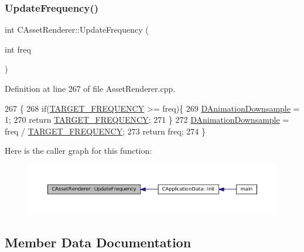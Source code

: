\subsubsection{\texorpdfstring{Update\+Frequency()}{UpdateFrequency()}}
{\footnotesize\ttfamily int C\+Asset\+Renderer\+::\+Update\+Frequency (\begin{DoxyParamCaption}\item[{int}]{freq }\end{DoxyParamCaption})\hspace{0.3cm}{\ttfamily [static]}}



Definition at line 267 of file Asset\+Renderer.\+cpp.


\begin{DoxyCode}
267                                            \{
268     \textcolor{keywordflow}{if}(\hyperlink{AssetRenderer_8cpp_a0d86e657ae1200c5ec796a3f31e36d49}{TARGET\_FREQUENCY} >= freq)\{
269         \hyperlink{classCAssetRenderer_a13ea9a19837c39e57db499f53366c5b8}{DAnimationDownsample} = 1;
270         \textcolor{keywordflow}{return} \hyperlink{AssetRenderer_8cpp_a0d86e657ae1200c5ec796a3f31e36d49}{TARGET\_FREQUENCY};   
271     \}
272     \hyperlink{classCAssetRenderer_a13ea9a19837c39e57db499f53366c5b8}{DAnimationDownsample} = freq / \hyperlink{AssetRenderer_8cpp_a0d86e657ae1200c5ec796a3f31e36d49}{TARGET\_FREQUENCY};
273     \textcolor{keywordflow}{return} freq;
274 \}
\end{DoxyCode}
Here is the caller graph for this function\+:
\nopagebreak
\begin{figure}[H]
\begin{center}
\leavevmode
\includegraphics[width=350pt]{classCAssetRenderer_a06e45891dcbc0a88570c537a4d6906c8_icgraph}
\end{center}
\end{figure}


\subsection{Member Data Documentation}
\hypertarget{classCAssetRenderer_a13ea9a19837c39e57db499f53366c5b8}{}\label{classCAssetRenderer_a13ea9a19837c39e57db499f53366c5b8} 

